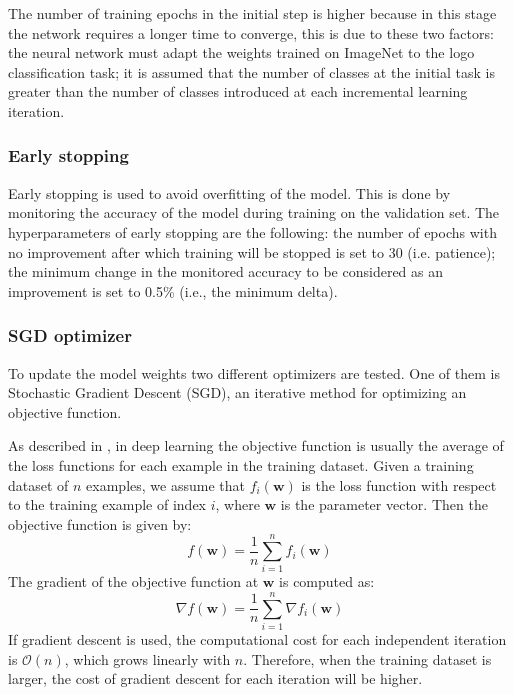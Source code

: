 The number of training epochs in the initial step is higher because in this stage the network requires a longer time to converge, this is due to these two factors: the neural network must adapt the weights trained on ImageNet to the logo classification task;
it is assumed that the number of classes at the initial task is greater than the number of classes introduced at each incremental learning iteration.

\subsubsection{Early stopping}
Early stopping is used to avoid overfitting of the model.
This is done by monitoring the accuracy of the model during training on the validation set.
The hyperparameters of early stopping are the following: the number of epochs with no improvement after which training will be stopped is set to 30 (i.e. patience); the minimum change in the monitored accuracy to be considered as an improvement is set to 0.5\% (i.e., the minimum delta).

\subsubsection{SGD optimizer}
\label{sec:sgd_opt}
To update the model weights two different optimizers are tested.
One of them is Stochastic Gradient Descent (SGD), an iterative method for optimizing an objective function.

As described in \cite{zhang2021dive}, in deep learning the objective function is usually the average of the loss functions for each example in the training dataset. Given a training dataset of $n$ examples, we assume that $f_i(\textbf{w})$ is the loss function with respect to the training example of index $i$, where $\textbf{w}$ is the parameter vector. Then the objective function is given by:
\begin{equation}
    f(\textbf{w}) = \frac{1}{n} \sum_{i=1}^n f_i(\textbf{w})
\end{equation}
The gradient of the objective function at $\textbf{w}$ is computed as:
\begin{equation}
    \nabla f(\textbf{w}) = \frac{1}{n} \sum_{i=1}^n \nabla f_i(\textbf{w})
\end{equation}
If gradient descent is used, the computational cost for each independent iteration is $\mathcal{O}(n)$, which grows linearly with $n$. Therefore, when the training dataset is larger, the cost of gradient descent for each iteration will be higher.

